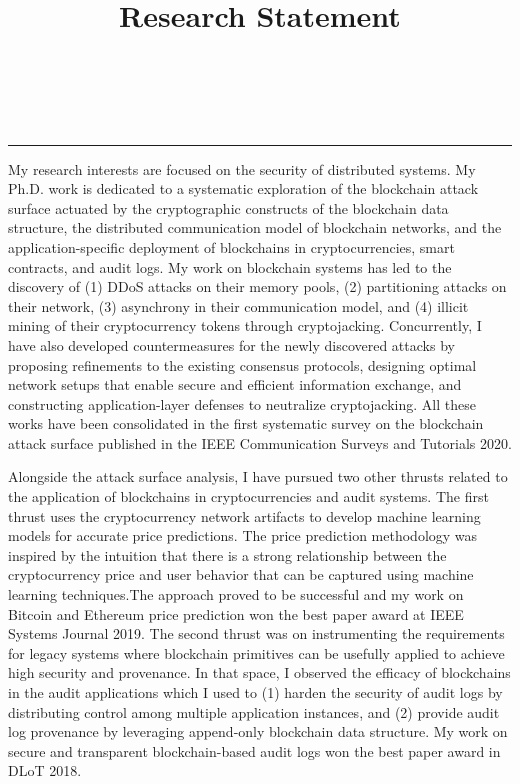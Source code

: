 \documentclass{NSF}
\begin{document}
\title{Research Statement}\\
\\\rule{\textwidth}{1.5pt}\vspace{3mm}

My research interests are focused on the security of distributed systems. My Ph.D. work is dedicated to a systematic exploration of the blockchain attack surface actuated by the cryptographic constructs of the blockchain data structure, the distributed communication model of blockchain networks, and the application-specific deployment of blockchains in cryptocurrencies, smart contracts, and audit logs. My work on blockchain systems has led to the discovery of (1) DDoS attacks on their memory pools, (2) partitioning attacks on their network, (3) asynchrony in their communication model, and (4) illicit mining of their cryptocurrency tokens through cryptojacking. Concurrently, I have also developed countermeasures for the newly discovered attacks by proposing refinements to the existing consensus protocols, designing optimal network setups that enable secure and efficient information exchange, and constructing application-layer defenses to neutralize cryptojacking. All these works have been consolidated in the first systematic survey on the blockchain attack surface published in the IEEE Communication Surveys and Tutorials 2020. 


Alongside the attack surface analysis, I have pursued two other thrusts related to the application of blockchains in cryptocurrencies and audit systems. The first thrust uses the cryptocurrency network artifacts to develop machine learning models for accurate price predictions. The price prediction methodology was inspired by the intuition that there is a strong relationship between the cryptocurrency price and user behavior that can be captured using machine learning techniques.The approach proved to be successful and my work on Bitcoin and Ethereum price prediction won the best paper award at IEEE Systems Journal 2019. The second thrust was on instrumenting the requirements for legacy systems where blockchain primitives can be usefully applied to achieve high security and provenance. In that space, I observed the efficacy of blockchains in the audit applications which I used to (1) harden the security of audit logs by distributing control among multiple application instances, and (2) provide audit log provenance by leveraging append-only blockchain data structure. My work on secure and transparent blockchain-based audit logs won the best paper award in DLoT 2018.   
\end{document}
